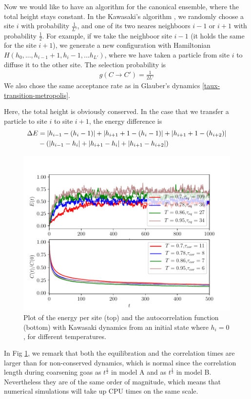 Now we would like to have an algorithm for the canonical ensemble, where the total height stays constant. In the Kawasaki's algorithm \cite{kawasaki_diffusion_1966}, we randomly choose a site $i$ with probability $\frac{1}{L'}$, and one of its two neares neighboors $i-1$ or $i+1$ with probability $\frac{1}{2}$. For example, if we take the neighboor site $i-1$ (it holds the same for the site $i+1$), we generate a new configuration with Hamiltonian $H(h_0,...,h_{i-1}+1,h_i-1,...h_{L'})$, where we have taken a particle from site $i$ to diffuse it to the other site.
The selection probability is
\begin{align}
g(C\to C') = \frac{1}{2L'}
\end{align}
We also chose the same acceptance rate as in Glauber's dynamics \eqref{taux-transition-metropolis}.

Here, the total height is obviously conserved. In the case that we transfer a particle to site $i$ to site $i+1$, the energy difference is
\begin{align}
\Delta E &= |h_{i-1}-(h_i - 1)| + |h_{i+1} + 1 -(h_i- 1)| + |h_{i+1} + 1-(h_{i+2} )| \nonumber \\
& - \left( |h_{i-1}-h_i| + |h_{i+1} -h_i| + |h_{i+1}-h_{i+2}| \right)
\end{align}

\begin{figure}[t]
\centering
\includegraphics[scale=1]{numerical/sos-kaw-eq-cor.pdf}
\caption{Plot of the energy per site (top) and the autocorrelation function (bottom) with Kawasaki dynamics from an initial state where $h_i=0$, for different temperatures.}
\label{eq-kaw}
\end{figure}
In Fig \ref{eq-kaw}, we remark that both the equilibration and the correlation times are larger than for non-conserved dynamics, which is normal since the correlation length during coarsening goas as $t^\frac{1}{2}$ in model A and as $t^\frac{1}{3}$ in model B. Nevertheless they are of the same order of magnitude, which means that numerical simulations will take up CPU times on the same scale.

